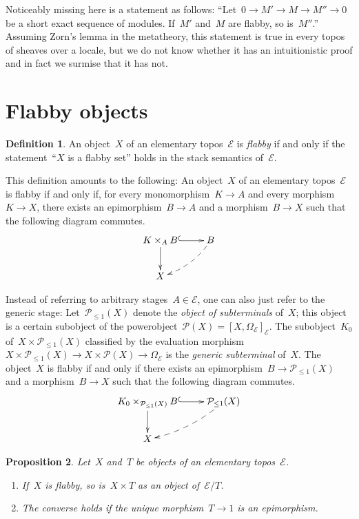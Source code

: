 \documentclass[oneside]{amsart}
\theoremstyle{definition}
\newtheorem{defn}{Definition}[section]
\theoremstyle{plain}
\newtheorem{prop}[defn]{Proposition}
\theoremstyle{remark}
\newcommand{\E}{\mathcal{E}}
\renewcommand{\P}{\mathcal{P}}
\renewcommand{\_}{\mathpunct{.}\,}
\begin{document}
Noticeably missing here is a statement as follows: ``Let~$0 \to M' \to M \to
M'' \to 0$ be a short exact sequence of modules. If~$M'$ and~$M$ are flabby, so
is~$M''$.'' Assuming Zorn's lemma in the metatheory, this statement is true in
every topos of sheaves over a locale, but we do not know whether it has an
intuitionistic proof and in fact we surmise that it has not.


\section{Flabby objects}
\label{sect:flabby-objects}

\begin{defn}An object~$X$ of an elementary topos~$\E$ is \emph{flabby} if and
only if the statement~``$X$ is a flabby set'' holds in the stack semantics
of~$\E$.\end{defn}

This definition amounts to the following: An object~$X$ of an elementary
topos~$\E$ is flabby if and only if, for every monomorphism~$K \to A$ and every
morphism~$K \to X$, there exists an epimorphism~$B \to A$ and a morphism~$B
\to X$ such that the following diagram commutes.
\[ \xymatrix{
  K \times_A B \ar@{^{(}->}[r]\ar[d] & B \ar@{-->}@/^/[ld] \\
  X
} \]

Instead of referring to arbitrary stages~$A \in \E$, one can also just refer to
the generic stage: Let~$\P_{\leq1}(X)$ denote the \emph{object of subterminals}
of~$X$; this object is a certain subobject of the powerobject~$\P(X) = [X,\Omega_\E]_\E$.
The subobject~$K_0$ of~$X \times \P_{\leq1}(X)$ classified by the
evaluation morphism~$X \times \P_{\leq1}(X) \to X \times \P(X) \to \Omega_\E$
is the \emph{generic subterminal} of~$X$. The object~$X$ is flabby if and only
if there exists an epimorphism~$B \to \P_{\leq1}(X)$ and a morphism~$B \to X$
such that the following diagram commutes.
\[ \xymatrix{
  K_0 \times_{\P_{\leq1}(X)} B \ar@{^{(}->}[r]\ar[d] & \P_{\leq1}(X) \ar@{-->}@/^/[ld] \\
  X
} \]

\begin{prop}\label{prop:basic-properties-of-flabby-objects}
Let~$X$ and~$T$ be objects of an elementary topos~$\E$.
\begin{enumerate}
\item If~$X$ is flabby, so is~$X \times T$ as an object of~$\E/T$.
\item The converse holds if the unique morphism~$T \to 1$ is an epimorphism.
\end{enumerate}
\end{prop}
\end{document}
